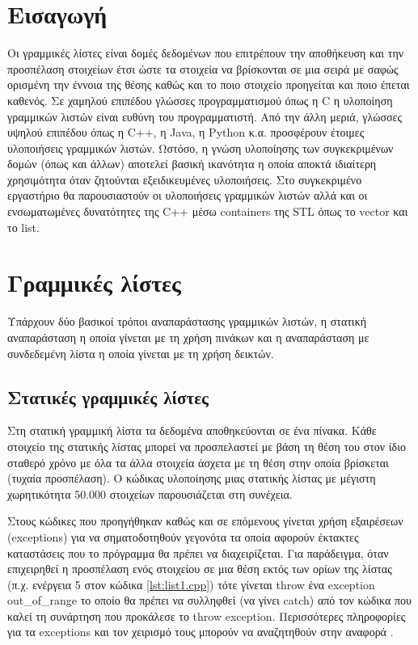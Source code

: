 \section{Εισαγωγή}
Οι γραμμικές λίστες είναι δομές δεδομένων που επιτρέπουν την αποθήκευση και την προσπέλαση στοιχείων έτσι ώστε τα στοιχεία να βρίσκονται σε μια σειρά με σαφώς ορισμένη την έννοια της θέσης καθώς και το ποιο στοιχείο προηγείται και ποιο έπεται καθενός. Σε χαμηλού επιπέδου γλώσσες προγραμματισμού όπως η C η υλοποίηση γραμμικών λιστών είναι ευθύνη του προγραμματιστή. Από την άλλη μεριά, γλώσσες υψηλού επιπέδου όπως η C++, η Java, η Python κ.α. προσφέρουν έτοιμες υλοποιήσεις γραμμικών λιστών. Ωστόσο, η γνώση υλοποίησης των συγκεκριμένων δομών (όπως και άλλων) αποτελεί βασική ικανότητα η οποία αποκτά ιδιαίτερη χρησιμότητα όταν ζητούνται εξειδικευμένες υλοποιήσεις. Στο συγκεκριμένο εργαστήριο θα παρουσιαστούν οι υλοποιήσεις γραμμικών λιστών αλλά και οι ενσωματωμένες δυνατότητες της C++ μέσω containers της STL όπως το vector και το list.

\section{Γραμμικές λίστες}
Υπάρχουν δύο βασικοί τρόποι αναπαράστασης γραμμικών λιστών, η στατική αναπαράσταση η οποία γίνεται με τη χρήση πινάκων και η αναπαράσταση με συνδεδεμένη λίστα η οποία γίνεται με τη χρήση δεικτών. 

\subsection{Στατικές γραμμικές λίστες}
Στη στατική γραμμική λίστα τα δεδομένα αποθηκεύονται σε ένα πίνακα. Κάθε στοιχείο της στατικής λίστας μπορεί να προσπελαστεί με βάση τη θέση του στον ίδιο σταθερό χρόνο με όλα τα άλλα στοιχεία άσχετα με τη θέση στην οποία βρίσκεται (τυχαία προσπέλαση). Ο κώδικας υλοποίησης μιας στατικής λίστας με μέγιστη χωρητικότητα 50.000 στοιχείων παρουσιάζεται στη συνέχεια.





Στους κώδικες που προηγήθηκαν καθώς και σε επόμενους γίνεται χρήση εξαιρέσεων (exceptions) για να σηματοδοτηθούν γεγονότα τα οποία αφορούν έκτακτες καταστάσεις που το πρόγραμμα θα πρέπει να διαχειρίζεται. Για παράδειγμα, όταν επιχειρηθεί η προσπέλαση ενός στοιχείου σε μια θέση εκτός των ορίων της λίστας (π.χ. ενέργεια 5 στον κώδικα \ref{lst:list1.cpp}) τότε γίνεται throw ένα exception out\_of\_range το οποίο θα πρέπει να συλληφθεί (να γίνει catch) από τον κώδικα που καλεί τη συνάρτηση που προκάλεσε το throw exception. Περισσότερες πληροφορίες για τα exceptions και τον χειρισμό τους μπορούν να αναζητηθούν στην αναφορά \cite{cppexceptions}.


